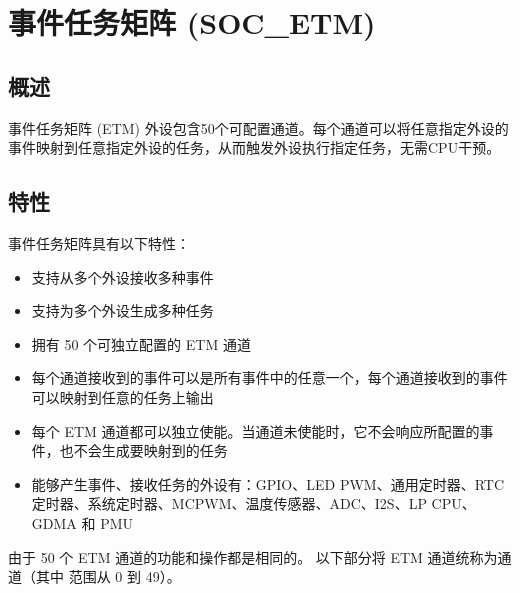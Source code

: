 \documentclass[main\_\_CN.tex]{subfiles}
\begin{document}

\ifglobal
\else
    {\let\clearpage\relax \listoftodos}
    {\let\clearpage\relax \listofdonetodos}
    \tableofcontents
\fi



\hypertarget{evntaskmatrix}{}
\chapter{事件任务矩阵 (SOC\_ETM)}
\label{mod:evntaskmatrix}


\section{概述}
事件任务矩阵 (ETM) 外设包含50个可配置通道。每个通道可以将任意指定外设的事件映射到任意指定外设的任务，从而触发外设执行指定任务，无需CPU干预。



\section{特性}
\label{sec:evntaskmatrix-features}

事件任务矩阵具有以下特性：
\begin{itemize}
    \item 支持从多个外设接收多种事件
    \item 支持为多个外设生成多种任务
    \item 拥有 50 个可独立配置的 ETM 通道
    \item 每个通道接收到的事件可以是所有事件中的任意一个，每个通道接收到的事件可以映射到任意的任务上输出
    \item 每个 ETM 通道都可以独立使能。当通道未使能时，它不会响应所配置的事件，也不会生成要映射到的任务
    \item 能够产生事件、接收任务的外设有：GPIO、LED PWM、通用定时器、RTC 定时器、系统定时器、MCPWM、温度传感器、ADC、I2S、LP CPU、GDMA 和 PMU
\end{itemize}

由于 50 个 ETM 通道的功能和操作都是相同的。 以下部分将 ETM 通道统称为通道（其中  范围从 0 到 49）。
\end{document}
